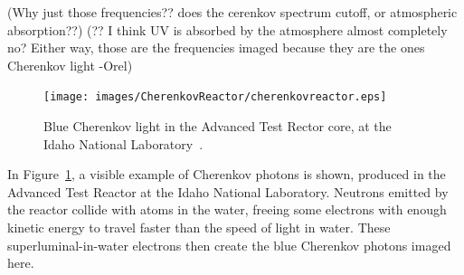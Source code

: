   {\color{red}(Why just those frequencies?? does the cerenkov spectrum cutoff, or atmospheric absorption??)}
  {\color{red}(?? I think UV is absorbed by the atmosphere almost completely no?  Either way, those are the frequencies imaged because they are the ones Cherenkov light -Orel)}
  
  \begin{figure}[ht]
    \centering
    \texttt{[image: images/CherenkovReactor/cherenkovreactor.eps]}
    \caption[Chernekov Light from a Reactor]{
      Blue Cherenkov light in the Advanced Test Rector core, at the Idaho National Laboratory~\cite{cherenkovreactor,atrlab}.
    }
    \label{fig:cherenkovreactor}
  \end{figure}
  
  In Figure~\ref{fig:cherenkovreactor}, a visible example of Cherenkov photons is shown, produced in the Advanced Test Reactor at the Idaho National Laboratory.
  Neutrons emitted by the reactor collide with atoms in the water, freeing some electrons with enough kinetic energy to travel faster than the speed of light in water.
  These superluminal-in-water electrons then create the blue Cherenkov photons imaged here.
  
